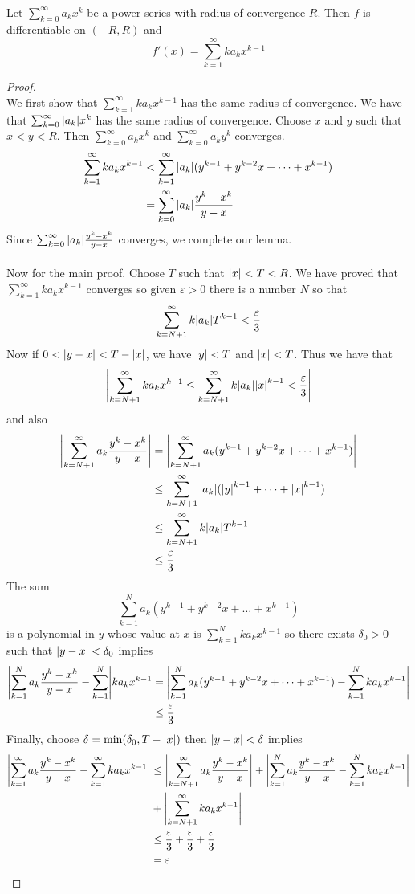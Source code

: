 \documentclass[a4paper]{article}
\begin{document}
\begin{prp}{}{}\\ Let $\sum_{k=0}^\infty a_kx^k$ be a power series with radius of convergence $R$. Then $f$ is differentiable on $(-R,R)$ and $$f'(x)=\sum_{k=1}^\infty ka_kx^{k-1}$$ 
\begin{proof}\\ We first show that $\sum_{k=1}^\infty ka_kx^{k-1}$ has the same radius of convergence. We have that $\sum_{k=0}^\infty \abs{a_k}x^k$ has the same radius of convergence. Choose $x$ and $y$ such that $x<y<R$. Then $\sum_{k=0}^\infty a_kx^k$ and $\sum_{k=0}^\infty a_ky^k$ converges. 
\begin{align*}
\sum_{k=1}^\infty ka_kx^{k-1}&<\sum_{k=1}^\infty\abs{a_k}(y^{k-1}+y^{k-2}x+\dots+x^{k-1})\\
&=\sum_{k=0}^\infty\abs{a_k}\frac{y^k-x^k}{y-x}
\end{align*}
Since $\sum_{k=0}^\infty\abs{a_k}\frac{y^k-x^k}{y-x}$ converges, we complete our lemma. \\~\\
Now for the main proof. Choose $T$ such that $\abs{x}<T<R$. We have proved that $\sum_{k=1}^\infty ka_kx^{k-1}$ converges so given $\varepsilon>0$ there is a number $N$ so that $$\sum_{k=N+1}^\infty k\abs{a_k}T^{k-1}<\frac{\varepsilon}{3}$$ Now if $0<\abs{y-x}<T-\abs{x}$, we have $\abs{y}<T$ and $\abs{x}<T$. Thus we have that $$\abs{\sum_{k=N+1}^\infty ka_kx^{k-1}\leq\sum_{k=N+1}^\infty k\abs{a_k}\abs{x}^{k-1}<\frac{\varepsilon}{3}}$$ and also
\begin{align*}
\abs{\sum_{k=N+1}^\infty a_k\frac{y^k-x^k}{y-x}}&=\abs{\sum_{k=N+1}^\infty a_k(y^{k-1}+y^{k-2}x+\dots+x^{k-1})}\\
&\leq\sum_{k=N+1}^\infty\abs{a_k}(\abs{y}^{k-1}+\dots+\abs{x}^{k-1})\\
&\leq\sum_{k=N+1}^\infty k\abs{a_k}T^{k-1}\\
&\leq\frac{\varepsilon}{3}
\end{align*} The sum $$\sum_{k=1}^Na_k(y^{k-1}+y^{k-2}x+\dots+x^{k-1})$$ is a polynomial in $y$ whose value at $x$ is $\sum_{k=1}^Nka_kx^{k-1}$ so there exists $\delta_0>0$ such that $\abs{y-x}<\delta_0$ implies 
\begin{align*}
\abs{\sum_{k=1}^Na_k\frac{y^k-x^k}{y-x}-\sum_{k=1}^N}ka_kx^{k-1}&=\abs{\sum_{k=1}^Na_k(y^{k-1}+y^{k-2}x+\dots+x^{k-1})-\sum_{k=1}^Nka_kx^{k-1}}\\
&\leq\frac{\varepsilon}{3}
\end{align*}
Finally, choose $\delta=\min(\delta_0,T-\abs{x})$ then $\abs{y-x}<\delta$ implies
\begin{align*}
\abs{\sum_{k=1}^\infty a_k\frac{y^k-x^k}{y-x}-\sum_{k=1}^\infty ka_kx^{k-1}}&\leq\abs{\sum_{k=N+1}^\infty a_k\frac{y^k-x^k}{y-x}}+\abs{\sum_{k=1}^N a_k\frac{y^k-x^k}{y-x}-\sum_{k=1}^N ka_kx^{k-1}}\\
&+\abs{\sum_{k=N+1}^\infty ka_kx^{k-1}}\\
&\leq\frac{\varepsilon}{3}+\frac{\varepsilon}{3}+\frac{\varepsilon}{3}\\
&=\varepsilon
\end{align*}
\end{proof}
\end{prp}
\end{document}
